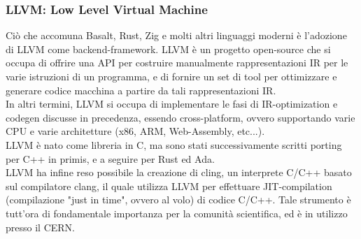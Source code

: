 \subsubsection{LLVM: Low Level Virtual Machine}
Ciò che accomuna Basalt, Rust, Zig e molti altri linguaggi moderni è l'adozione di LLVM come backend-framework.
LLVM è un progetto open-source che si occupa di offrire una API per costruire manualmente rappresentazioni IR per 
le varie istruzioni di un programma, e di fornire un set di tool per ottimizzare e generare codice macchina a partire
da tali rappresentazioni IR. \\ 

In altri termini, LLVM si occupa di implementare le fasi di IR-optimization e codegen discusse in precedenza, 
essendo cross-platform, ovvero supportando varie CPU e varie architetture (x86, ARM, Web-Assembly, etc...). \\

LLVM è nato come libreria in C, ma sono stati successivamente scritti porting per C++ in primis, e a seguire 
per Rust ed Ada. \\

LLVM ha infine reso possibile la creazione di cling, un interprete C/C++ basato sul compilatore clang, il quale 
utilizza LLVM per effettuare JIT-compilation (compilazione "just in time", ovvero al volo) di codice C/C++. Tale 
strumento è tutt'ora di fondamentale importanza per la comunità scientifica, ed è in utilizzo presso il CERN.

\newpage